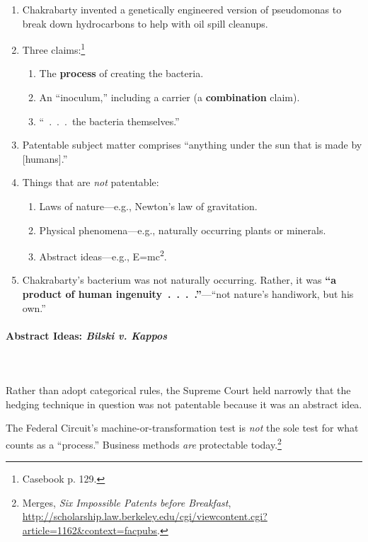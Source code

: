 \begin{enumerate}
    \item Chakrabarty invented a genetically engineered version of pseudomonas 
    to break down hydrocarbons to help with oil spill cleanups.
    \item Three claims:\footnote{Casebook p. 129.}
    \begin{enumerate}
        \item The \textbf{process} of creating the bacteria.
        \item An ``inoculum,'' including a carrier (a \textbf{combination} 
        claim).
        \item ``~.~.~.~the bacteria themselves.''
    \end{enumerate}
    \item Patentable subject matter comprises ``anything under the sun that is 
    made by [humans].''
    \item Things that are \emph{not} patentable:
    \begin{enumerate}
        \item Laws of nature---e.g., Newton's law of gravitation.
        \item Physical phenomena---e.g., naturally occurring plants or minerals.
        \item Abstract ideas---e.g., E=mc\textsuperscript{2}.
    \end{enumerate}
    \item Chakrabarty's bacterium was not naturally occurring. Rather, it was 
    \textbf{``a product of human ingenuity~.~.~.~.''}---``not nature's 
    handiwork, but his own.''
\end{enumerate}

\paragraph{Abstract Ideas: \emph{Bilski v. Kappos}} 
~\\\\
Rather than adopt categorical rules, the Supreme Court held narrowly that the 
hedging technique in question was not patentable because it was an abstract 
idea.

The Federal Circuit's machine-or-transformation test is \emph{not} the sole 
test for what counts as a ``process.'' Business methods \emph{are} protectable 
today.\footnote{Merges, \emph{Six Impossible Patents before Breakfast}, 
\url{http://scholarship.law.berkeley.edu/cgi/viewcontent.cgi?article=1162&context=facpubs}.}

